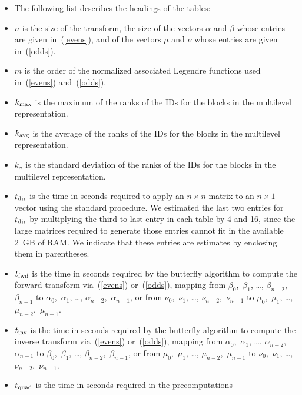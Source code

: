 \documentclass[final,3p,times]{elsarticle}
\begin{document}
\begin{itemize}
\item[] The following list describes the headings of the tables:
\item $n$ is the size of the transform, the size of the vectors
      $\alpha$ and $\beta$ whose entries are given in~(\ref{evens}),
      and of the vectors $\mu$ and $\nu$ whose entries are given
      in~(\ref{odds}).
\item $m$ is the order of the normalized associated Legendre functions
      used in~(\ref{evens}) and~(\ref{odds}).
\item $k_{\rm max}$ is the maximum of the ranks of the IDs for the blocks
      in the multilevel representation.
\item $k_{\rm avg}$ is the average of the ranks of the IDs for the blocks
      in the multilevel representation.
\item $k_{\sigma}$ is the standard deviation of the ranks of the IDs
      for the blocks in the multilevel representation.
\item $t_{\rm dir}$ is the time in seconds required to apply an $n \times n$
      matrix to an $n \times 1$ vector using the standard procedure.
      We estimated the last two entries for $t_{\rm dir}$ by multiplying
      the third-to-last entry in each table by 4 and 16,
      since the large matrices required to generate those entries
      cannot fit in the available 2~GB of RAM. We indicate that these entries
      are estimates by enclosing them in parentheses.
\item $t_{\rm fwd}$ is the time in seconds required by the butterfly algorithm
      to compute the forward transform via~(\ref{evens}) or~(\ref{odds}),
      mapping from $\beta_0$,~$\beta_1$, \dots, $\beta_{n-2}$,~$\beta_{n-1}$
      to $\alpha_0$,~$\alpha_1$, \dots, $\alpha_{n-2}$,~$\alpha_{n-1}$,
      or from $\nu_0$,~$\nu_1$, \dots, $\nu_{n-2}$,~$\nu_{n-1}$
      to $\mu_0$,~$\mu_1$, \dots, $\mu_{n-2}$,~$\mu_{n-1}$.
\item $t_{\rm inv}$ is the time in seconds required by the butterfly algorithm
      to compute the inverse transform via~(\ref{evens}) or~(\ref{odds}),
      mapping from $\alpha_0$,~$\alpha_1$, \dots,
      $\alpha_{n-2}$,~$\alpha_{n-1}$
      to $\beta_0$,~$\beta_1$, \dots, $\beta_{n-2}$,~$\beta_{n-1}$,
      or from $\mu_0$,~$\mu_1$, \dots, $\mu_{n-2}$,~$\mu_{n-1}$
      to $\nu_0$,~$\nu_1$, \dots, $\nu_{n-2}$,~$\nu_{n-1}$.
\item $t_{\rm quad}$ is the time in seconds required in the precomputations

\end{itemize}
\end{document}
